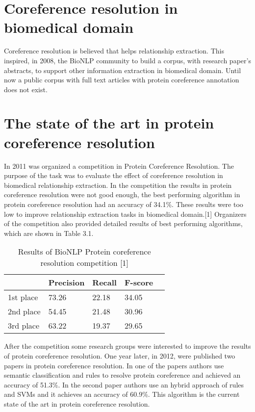\section{Coreference resolution in biomedical domain}

Coreference resolution is believed that helps relationship extraction. This inspired, in 2008, the BioNLP community to build a corpus, with research paper's abstracts, to support other information extraction in biomedical domain. Until now a public corpus with full text articles with protein coreference annotation does not exist.

\section{The state of the art in protein coreference resolution} 

In 2011 was organized a competition in Protein Coreference Resolution. The purpose of the task was to evaluate the effect of coreference resolution in biomedical relationship extraction. In the competition the results in protein coreference resolution were not good enough, the best performing algorithm in protein coreference resolution had an accuracy of 34.1\%. These results were too low to improve relationship extraction tasks in biomedical domain.[1] Organizers of the competition also provided detailed results of best performing algorithms, which are shown in Table 3.1.
\newpage
\begin{table}[h]
  \begin{center}
  \centering
     \begin{tabular}{L{2.0cm} C{2.2cm} C{2.2cm} C{2.2cm} @{}m{0pt}@{}} 
	 	
  		& Precision & Recall & F-score& \\ [1.1ex] 
 		\hline
 		1st place & 73.26 & 22.18 & 34.05& \\ [1.1ex]
 		\hline
 		2nd place & 54.45 & 21.48 & 30.96& \\[1.1ex]
  		\hline
 		3rd place & 63.22 & 19.37 & 29.65& \\ [1.1ex]
  		\hline
	\end{tabular}
  \end{center} 
  \caption{ Results of BioNLP Protein coreference resolution competition [1]}
  \label{table2}
\end{table}

After the competition some research groups were interested to improve the results of protein coreference resolution. One year later, in 2012, were published two papers in protein coreference resolution. In one of the papers authors use semantic classification and rules to resolve protein coreference and achieved an accuracy of 51.3\%. In the second paper authors use an hybrid approach of rules and SVMs and it achieves an accuracy of 60.9\%. This algorithm is the current state of the art in protein coreference resolution.
 
